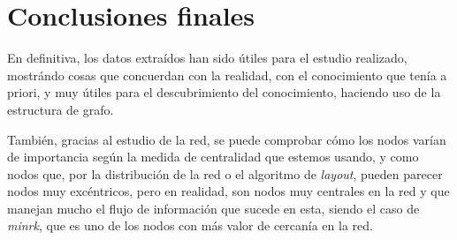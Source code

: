 \documentclass[paper=a4, fontsize=11pt]{article} %
\numberwithin{equation}{section} %
\numberwithin{figure}{section} %
\numberwithin{table}{section} %
\begin{document}
\section{Conclusiones finales}

En definitiva, los datos extraídos han sido útiles para el estudio realizado, mostrándo cosas que concuerdan con la realidad, con el conocimiento que tenía a priori, y muy útiles para el descubrimiento del conocimiento, haciendo uso de la estructura de grafo. 

También, gracias al estudio de la red, se puede comprobar cómo los nodos varían de importancia según la medida de centralidad que estemos usando, y como nodos que, por la distribución de la red o el algoritmo de \textit{layout}, pueden parecer nodos muy excéntricos, pero en realidad, son nodos muy centrales en la red y que manejan mucho el flujo de información que sucede en esta, siendo el caso de \textit{minrk}, que es uno de los nodos con más valor de cercanía en la red.

\end{document}
